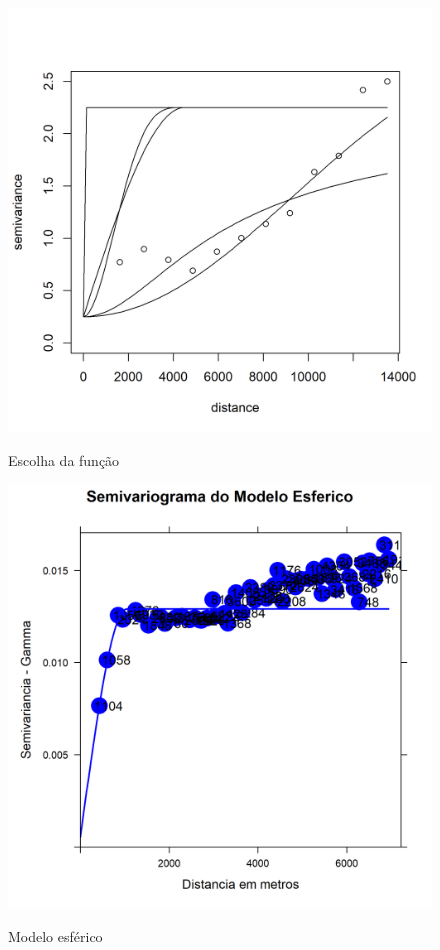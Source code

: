			\begin{minipage}[t!]{0.31\textwidth}
				\begin{figure}[H]
					\centering \small \caption{ Escolha da função }
					\includegraphics[width=0.97\linewidth]{FIGURAS/variogramageor4}
					\label{fig:variogramageor4}
				\end{figure}			
				
			\end{minipage}\hfill
			\begin{minipage}[t!]{0.31\textwidth}
				
				\begin{figure}[H]
					\centering \small \caption{Modelo esférico}
					\includegraphics[width=0.97\linewidth]{FIGURAS/modelos-esferico}
					\label{fig:varexpfitsp}
				\end{figure}			
				
			\end{minipage} 
